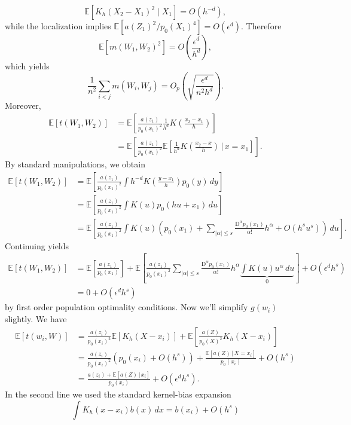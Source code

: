 \documentclass[11pt]{article}
\begin{document}
\[
\mathbb{E}[K_h(X_2-X_1)^2\mid X_1] = O(h^{-d}),
\]
while the localization implies $\mathbb{E}[a(Z_1)^2/p_0(X_1)^4] = O(\epsilon^d)$. Therefore
\[
\mathbb{E}[m(W_1,W_2)^2] = O\left(\frac{\epsilon^d}{h^d}\right),
\]
which yields
\[
\frac{1}{n^2}\sum_{i<j}m(W_i,W_j)
= O_p\left(\sqrt{\frac{\epsilon^d}{n^2h^d}}\right).
\]
Moreover,
\begin{align*}
    \mathbb{E}[t(W_1, W_2)] &= \mathbb{E}\left[\frac{a(z_1)}{p_0(x_1)^2}\frac{1}{h^d}K\left(\frac{x_2 - x_1}{h}\right)\right] \\
    &= \mathbb{E}\left[\frac{a(z_1)}{p_0(x_1)^2}\mathbb{E}\left[\frac{1}{h^d}K\left(\frac{x_2 - x}{h}\right)\,\Bigg|\, x = x_1\right]\right].
\end{align*}
By standard manipulations, we obtain 
\begin{align*}
    \mathbb{E}[t(W_1, W_2)] &= \mathbb{E}\left[\frac{a(z_1)}{p_0(x_1)^2}\int h^{-d}K\left(\frac{y - x_1}{h}\right)p_0(y) \,dy\right] \\
    &= \mathbb{E}\left[\frac{a(z_1)}{p_0(x_1)^2}\int K\left(u\right)p_0(hu + x_1) \,du\right] \tag{$u = (y-x_1)/h$} \\
    &= \mathbb{E}\left[\frac{a(z_1)}{p_0(x_1)^2}\int K\left(u\right)\left(p_0(x_1) + \sum_{|\alpha| \leq s}\frac{\text{D}^\alpha p_0(x_1)}{\alpha!}h^\alpha + O(h^su^s)\right) \,du\right].
\end{align*}
Continuing yields
\begin{align*}
    \mathbb{E}[t(W_1, W_2)] &= \mathbb{E}\left[\frac{a(z_1)}{p_0(x_1)}\right] + \mathbb{E}\left[\frac{a(z_1)}{p_0(x_1)^2}\sum_{|\alpha| \leq s}\frac{\text{D}^\alpha p_0(x_1)}{\alpha!}h^\alpha \underbrace{\int K\left(u\right) u^\alpha \,du}_{0}\right]  + O(\epsilon ^dh^s) \\
    &= 0 + O(\epsilon^d h^s)
\end{align*}
by first order population optimality conditions. Now we'll simplify $g(w_i)$ slightly. We have
\begin{align*}
    \mathbb{E}[t(w_i, W)] &=  
    \frac{a(z_i)}{p_0(x_i)^2}\mathbb{E}\left[K_h(X - x_i)\right] + \mathbb{E}\left[\frac{a(Z)}{p_0(X)^2}K_h(X - x_i)\right] \\
    &= \frac{a(z_i)}{p_0(x_i)^2}\left(p_0(x_i) + O(h^s)\right) + \frac{\mathbb{E}[a(Z)\, | \, X = x_i]}{p_0(x_i)} + O(h^s)\\
    &= \frac{a(z_i) + \mathbb{E}[a(Z)\,| \,x_i]}{p_0(x_i)} + O(\epsilon^dh^s). 
\end{align*}
In the second line we used the standard kernel-bias expansion
\[
\int K_h(x-x_i)b(x)\,dx = b(x_i)+O(h^s)
\]
\end{document}

